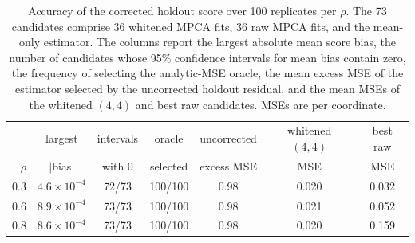 \begin{table}[tbp]
\centering
\small
\setlength{\tabcolsep}{4pt}
\caption{Accuracy of the corrected holdout score over 100 replicates per $\rho$.  The 73 candidates comprise 36 whitened MPCA fits, 36 raw MPCA fits, and the mean-only estimator.  The columns report the largest absolute mean score bias, the number of candidates whose 95\% confidence intervals for mean bias contain zero, the frequency of selecting the analytic-MSE oracle, the mean excess MSE of the estimator selected by the uncorrected holdout residual, and the mean MSEs of the whitened $(4,4)$ and best raw candidates.  MSEs are per coordinate.}
\label{tab:colored-calibration}
\begin{tabular}{rcccccc}
\toprule
 & largest & intervals & oracle & uncorrected & whitened $(4,4)$ & best raw\\
$\rho$ & $|$bias$|$ & with 0 & selected & excess MSE & MSE & MSE\\
\midrule
0.3 & $4.6\times10^{-4}$ & 72/73 & 100/100 & 0.98 & 0.020 & 0.032\\
0.6 & $8.9\times10^{-4}$ & 73/73 & 100/100 & 0.98 & 0.021 & 0.052\\
0.8 & $8.6\times10^{-4}$ & 73/73 & 100/100 & 0.98 & 0.020 & 0.159\\
\bottomrule
\end{tabular}
\end{table}
